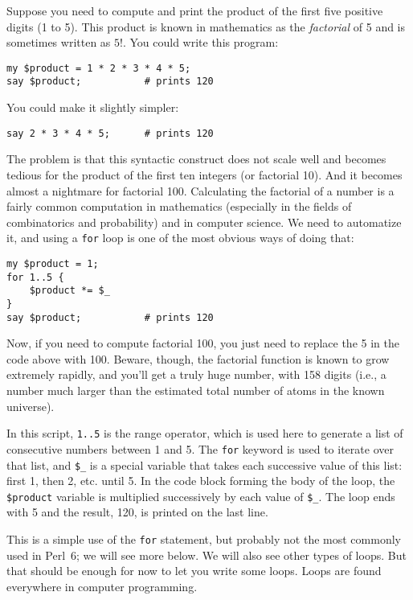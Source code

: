 Suppose you need to compute and print the product of the first 
five positive digits (1 to 5). This product is known in mathematics 
as the \emph{factorial} of 5 and is sometimes written as $5!$. 
You could write this program:

\begin{verbatim}
my $product = 1 * 2 * 3 * 4 * 5;
say $product;           # prints 120
\end{verbatim}
%

You could make it slightly simpler:
\begin{verbatim}
say 2 * 3 * 4 * 5;      # prints 120
\end{verbatim}
%

The problem is that this syntactic construct does 
not scale well and becomes tedious for the product of the first 
ten integers (or factorial 10). And it becomes almost a 
nightmare for factorial 100. 
Calculating the factorial of a number is a fairly common computation 
in mathematics (especially in the fields of combinatorics 
and probability) and in computer science. We need to 
automatize it, and using a {\tt for} 
loop is one of the most obvious ways of doing that:

\begin{verbatim}
my $product = 1;
for 1..5 {
    $product *= $_
}
say $product;           # prints 120
\end{verbatim}

Now, if you need to compute factorial 100, you just need to 
replace the 5 in the code above with 100. Beware, though, 
the factorial function is known to grow extremely rapidly, 
and you'll get a truly huge number, with 158 digits 
(i.e., a number much larger than the estimated total 
number of atoms in the known universe).

In this script, {\tt 1..5} is the range operator, which is used here 
to generate a list of consecutive numbers between 1 and 5. The 
{\tt for} keyword is used to iterate over that list, and  
\verb"$_" is a special variable that takes each successive 
value of this list: first 1, then 2, etc. until 5. In the code 
block forming the body of the loop, the {\tt \$product} variable 
is multiplied successively by each value of \verb"$_". The loop 
ends with 5 and the result, 120, is printed on the last line.

This is a simple use of the {\tt for} statement, 
but probably not the most commonly used in Perl~6; 
we will see more below. We will also see other types of loops. 
But that should be enough for now to let you write some loops. Loops 
are found everywhere in computer programming.

